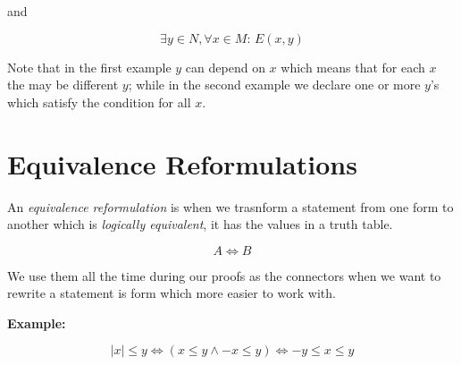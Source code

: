 and

\[
	\exists y \in N, \forall x \in M: \, E(x, y)
\]

Note that in the first example \(y\) can depend on \(x\) which means that for each \(x\) the may be different \(y\); while in the second example
we declare one or more \(y\)'s which satisfy the condition for all \(x\).


\section{Equivalence Reformulations}

An \emph{equivalence reformulation} is when we trasnform a statement from one form to another which is \emph{logically equivalent}, it has the values in a truth table.

\[
	A \iff B
\]

We use them all the time during our proofs as the connectors when we want to rewrite a statement is form which more easier to work with.

\textbf{Example:}

\[
	|x| \le y \iff (x \le y \land -x \le y) \iff -y \le x \le y
\]

